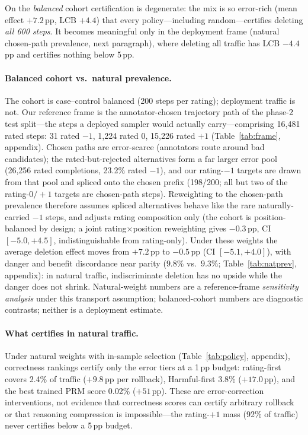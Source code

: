 \documentclass[11pt]{article}
\newcommand{\ci}[2]{[#1, #2]}
\begin{document}
On the \emph{balanced} cohort certification is degenerate: the mix is so error-rich (mean effect $+7.2$\,pp, LCB $+4.4$) that every policy---including random---certifies deleting \emph{all 600 steps}. It becomes meaningful only in the deployment frame (natural chosen-path prevalence, next paragraph), where deleting all traffic has LCB $-4.4$\,pp and certifies nothing below 5\,pp.

\paragraph{Balanced cohort vs.\ natural prevalence.}
The cohort is case--control balanced (200 steps per rating); deployment traffic is not. Our reference frame is the annotator-chosen trajectory path of the phase-2 test split---the steps a deployed sampler would actually carry---comprising 16{,}481 rated steps: 31 rated $-1$, 1{,}224 rated $0$, 15{,}226 rated $+1$ (Table~\ref{tab:frame}, appendix). Chosen paths are error-scarce (annotators route around bad candidates); the rated-but-rejected alternatives form a far larger error pool (26{,}256 rated completions, 23.2\% rated $-1$), and our rating-$-1$ targets are drawn from that pool and spliced onto the chosen prefix (198/200; all but two of the rating-$0/{+}1$ targets are chosen-path steps). Reweighting to the chosen-path prevalence therefore assumes spliced alternatives behave like the rare naturally-carried $-1$ steps, and adjusts rating composition only (the cohort is position-balanced by design; a joint rating$\times$position reweighting gives $-0.3$\,pp, CI $\ci{-5.0}{+4.5}$, indistinguishable from rating-only). Under these weights the average deletion effect moves from $+7.2$\,pp to $-0.5$\,pp (CI $\ci{-5.1}{+4.0}$), with danger and benefit discordance near parity ($9.8\%$ vs.\ $9.3\%$; Table~\ref{tab:natprev}, appendix): in natural traffic, indiscriminate deletion has no upside while the danger does not shrink. Natural-weight numbers are a reference-frame \emph{sensitivity analysis} under this transport assumption; balanced-cohort numbers are diagnostic contrasts; neither is a deployment estimate.

\paragraph{What certifies in natural traffic.}
Under natural weights with in-sample selection (Table~\ref{tab:policy}, appendix), correctness rankings certify only the error tiers at a 1\,pp budget: rating-first covers 2.4\% of traffic ($+9.8$\,pp per rollback), Harmful-first 3.8\% ($+17.0$\,pp), and the best trained PRM score 0.02\% ($+51$\,pp). These are error-correction interventions, not evidence that correctness scores can certify arbitrary rollback or that reasoning compression is impossible---the rating-$+1$ mass (92\% of traffic) never certifies below a 5\,pp budget.
\end{document}
